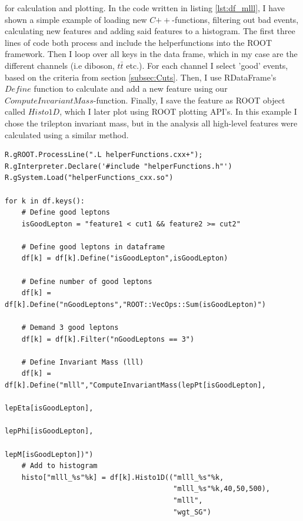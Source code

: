 for calculation and plotting. In the code written in listing \ref{lst:df_mlll}, I have shown a simple example 
of loading new $C{++}$-functions, filtering out bad events, calculating new features and adding said 
features to a histogram. The first three lines of code both process and include the helperfunctions 
into the ROOT framework. Then I loop over all keys in the data frame, which in my case
are the different channels (i.e diboson, $t\bar{t}$ etc.). For each channel I select 'good' events,
based on the criteria from section \ref{subsec:Cuts}. Then, I use RDataFrame's $Define$ function to calculate
and add a new feature using our $ComputeInvariantMass$-function. Finally, I save the feature as ROOT object called 
$Histo1D$, which I later plot using ROOT plotting \ac{API}'s. In this example I chose the trilepton invariant mass, 
but in the analysis all high-level features were calculated using a similar method. 
\lstset{style=Python}
\begin{lstlisting}[caption={Python-file for calling dataframe and calculating $M_{lll}$.},captionpos=b, label={lst:df_mlll}]
R.gROOT.ProcessLine(".L helperFunctions.cxx+");
R.gInterpreter.Declare('#include "helperFunctions.h"') 
R.gSystem.Load("helperFunctions_cxx.so")

for k in df.keys():
    # Define good leptons
    isGoodLepton = "feature1 < cut1 && feature2 >= cut2"

    # Define good leptons in dataframe
    df[k] = df[k].Define("isGoodLepton",isGoodLepton)

    # Define number of good leptons
    df[k] = df[k].Define("nGoodLeptons","ROOT::VecOps::Sum(isGoodLepton)")

    # Demand 3 good leptons 
    df[k] = df[k].Filter("nGoodLeptons == 3")

    # Define Invariant Mass (lll)
    df[k] = df[k].Define("mlll","ComputeInvariantMass(lepPt[isGoodLepton], 
                                                      lepEta[isGoodLepton], 
                                                      lepPhi[isGoodLepton], 
                                                      lepM[isGoodLepton])")
    # Add to histogram
    histo["mlll_%s"%k] = df[k].Histo1D(("mlll_%s"%k,
                                        "mlll_%s"%k,40,50,500),
                                        "mlll",
                                        "wgt_SG")     
\end{lstlisting}



